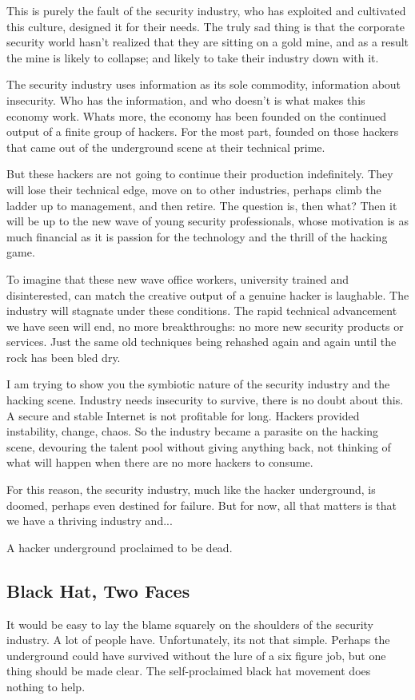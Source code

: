 \documentclass[letterpaper,12pt,english]{sphinxmanual}
\begin{document}
This is purely the fault of the security industry, who has exploited
and cultivated this culture, designed it for their needs. The truly sad
thing is that the corporate security world hasn't realized that they are
sitting on a gold mine, and as a result the mine is likely to collapse;
and likely to take their industry down with it.

The security industry uses information as its sole commodity, information
about insecurity. Who has the information, and who doesn't is what
makes this economy work. Whats more, the economy has been founded on
the continued output of a finite group of hackers. For the most part,
founded on those hackers that came out of the underground scene at their
technical prime.

But these hackers are not going to continue their production
indefinitely. They will lose their technical edge, move on to other
industries, perhaps climb the ladder up to management, and then
retire. The question is, then what? Then it will be up to the new wave
of young security professionals, whose motivation is as much financial
as it is passion for the technology and the thrill of the hacking game.

To imagine that these new wave office workers, university trained and
disinterested, can match the creative output of a genuine hacker is
laughable. The industry will stagnate under these conditions. The rapid
technical advancement we have seen will end, no more breakthroughs:
no more new security products or services. Just the same old techniques
being rehashed again and again until the rock has been bled dry.

I am trying to show you the symbiotic nature of the security industry
and the hacking scene. Industry needs insecurity to survive, there is
no doubt about this. A secure and stable Internet is not profitable for
long. Hackers provided instability, change, chaos. So the industry became
a parasite on the hacking scene, devouring the talent pool without giving
anything back, not thinking of what will happen when there are no more
hackers to consume.

For this reason, the security industry, much like the hacker underground,
is doomed, perhaps even destined for failure. But for now, all that
matters is that we have a thriving industry and...

A hacker underground proclaimed to be dead.


\subsection{Black Hat, Two Faces}
\label{underground-myth:black-hat-two-faces}
It would be easy to lay the blame squarely on the shoulders of the
security industry. A lot of people have. Unfortunately, its not that
simple. Perhaps the underground could have survived without the lure of
a six figure job, but one thing should be made clear. The self-proclaimed
black hat movement does nothing to help.
\end{document}
